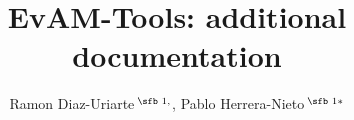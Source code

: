 \documentclass[a4paper,11pt]{article}
\title{EvAM-Tools: additional documentation}
\author{Ramon Diaz-Uriarte\,$^{\text{\sfb 1,}}$, Pablo Herrera-Nieto\,$^{\text{\sfb 1}*}$}
\begin{document}
\begin{titlepage}
\maketitle
\tableofcontents
\end{titlepage}

 



\end{document}

